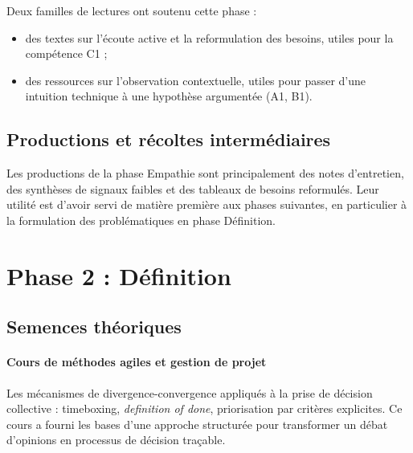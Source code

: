 Deux familles de lectures ont soutenu cette phase :
\begin{itemize}
  \item des textes sur l'écoute active et la reformulation des besoins, utiles pour la compétence C1 ;
  \item des ressources sur l'observation contextuelle, utiles pour passer d'une intuition technique à une hypothèse argumentée (A1, B1).
\end{itemize}

\subsection{Productions et récoltes intermédiaires}

Les productions de la phase Empathie sont principalement des notes d'entretien, des synthèses de signaux faibles et des tableaux de besoins reformulés. Leur utilité est d'avoir servi de matière première aux phases suivantes, en particulier à la formulation des problématiques en phase Définition.

\section{Phase 2 : Définition}


\subsection{Semences théoriques}

\paragraph{Cours de méthodes agiles et gestion de projet}
Les mécanismes de diver\-gence-con\-vergence appliqués à la prise de décision collective : timeboxing, \textit{definition of done}, priorisation par critères explicites. Ce cours a fourni les bases d'une approche structurée pour transformer un débat d'opinions en processus de décision traçable.

